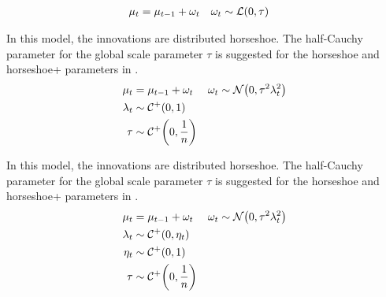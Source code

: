 \begin{description}[font = \normalfont\ModelII]
\begin{equation}
\begin{aligned}[t]
      \mu_{t} &= \mu_{t - 1} + \omega_{t} & \omega_{t} & \sim \mathcal{L}\mathopen{}\left(0, \tau\right)\mathclose{}
    \end{aligned}
  \end{equation}
\item[Horseshoe] In this model, the innovations are distributed horseshoe.
  The half-Cauchy parameter for the global scale parameter $\tau$ is suggested for the horseshoe and horseshoe+ parameters in \textcite{BhadraDattaPolsonEtAl2015a}.
  \begin{equation}
    \label{dlm:eq:19}
    \begin{aligned}[t]
      \mu_{t} &= \mu_{t - 1} + \omega_{t} & \omega_{t} & \sim \mathcal{N}\mathopen{}\left(0, \tau^{2} \lambda^{2}_{t}\right)\mathclose{} \\
      \lambda_{t} &\sim \mathcal{C^+}\mathopen{}\left(0, 1\right)\mathclose{} \\
      \tau &\sim \mathcal{C^+}\mathopen{}\left(0, \frac{1}{n}\right)\mathclose{}
    \end{aligned}
  \end{equation}
\item[Horseshoe+] In this model, the innovations are distributed horseshoe.
  The half-Cauchy parameter for the global scale parameter $\tau$ is suggested for the horseshoe and horseshoe+ parameters in \textcite{BhadraDattaPolsonEtAl2015a}.
  \begin{equation}
    \label{dlm:eq:23}
    \begin{aligned}[t]
      \mu_{t} &= \mu_{t - 1} + \omega_{t} & \omega_{t} & \sim \mathcal{N}\mathopen{}\left(0, \tau^{2} \lambda^{2}_{t}\right)\mathclose{} \\
      \lambda_{t} &\sim \mathcal{C^+}\mathopen{}\left(0, \eta_{t}\right)\mathclose{} \\
      \eta_{t} &\sim \mathcal{C^+}\mathopen{}\left(0, 1\right)\mathclose{} \\
      \tau &\sim \mathcal{C^+}\mathopen{}\left(0, \frac{1}{n}\right)\mathclose{}
    \end{aligned}
  \end{equation}
\end{description}



